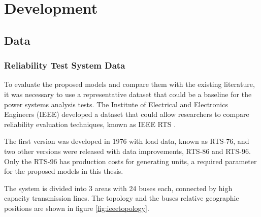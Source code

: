 \documentclass[12pt,LUDisStyle,twosided]{book}
\begin{document}
\chapter{Development}
\section{Data}

\subsection{Reliability Test System Data}

To evaluate the proposed models and compare them with the existing literature, it was necessary to use a representative dataset that could be a baseline for the power systems analysis tests. The Institute of Electrical and Electronics Engineers (IEEE) developed a dataset that could allow researchers to compare reliability evaluation techniques, known as IEEE RTS \cite{wongieee}. 

The first version was developed in 1976 with load data, known as RTS-76, and two other versions were released with data improvements, RTS-86 and RTS-96. Only the RTS-96 has production costs for generating units, a required parameter for the proposed models in this thesis.

The system is divided into 3 areas with 24 buses each, connected by high capacity transmission lines. The topology and the buses relative geographic positions are shown in figure \ref{fig:ieeetopology}.
\end{document}
